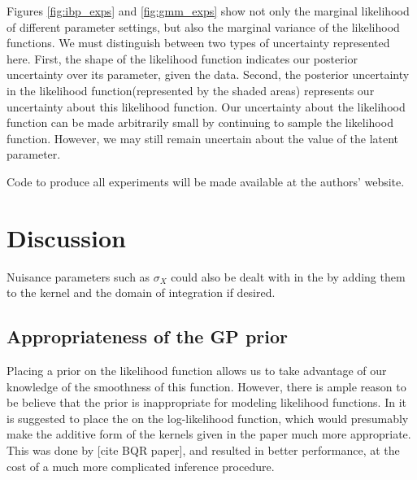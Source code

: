 Figures \ref{fig:ibp_exps} and \ref{fig:gmm_exps} show not only the marginal likelihood of different parameter settings, but also the marginal variance of the likelihood functions.  We must distinguish between two types of uncertainty represented here.  First, the shape of the likelihood function indicates our posterior uncertainty over its parameter, given the data.  Second, the \gp{} posterior uncertainty in the likelihood function(represented by the shaded areas) represents our uncertainty about this likelihood function.  Our uncertainty about the likelihood function can be made arbitrarily small by continuing to sample the likelihood function.  However, we may still remain uncertain about the value of the latent parameter.


Code to produce all experiments will be made available at the authors' website.



 

\section{Discussion}

Nuisance parameters such as $\sigma_X$ could also be dealt with in the \bq{} by adding them to the kernel and the domain of integration if desired.


\subsection{Appropriateness of the GP prior}

Placing a \gp{} prior on the likelihood function allows us to take advantage of our knowledge of the smoothness of this function.  However, there is ample reason to be believe that the \gp{} prior is inappropriate for modeling likelihood functions. In \cite{BZMonteCarlo} it is suggested to place the \gp{} on the log-likelihood function, which would presumably make the additive form of the kernels given in the paper much more appropriate. This was done by [cite BQR paper], and resulted in better performance, at the cost of a much more complicated inference procedure.

